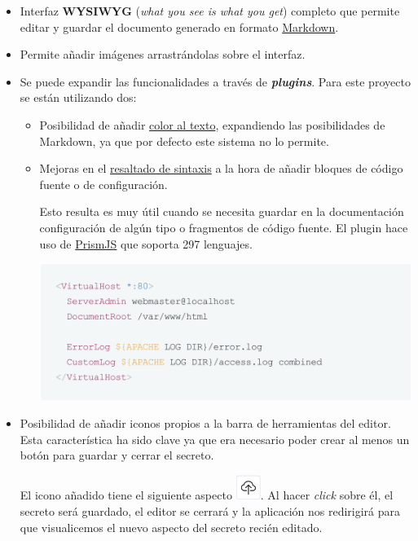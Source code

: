 \documentclass{\ClassPath/viu-tfm-template}
\begin{document}
\begin{itemize}
    \item Interfaz \textbf{WYSIWYG} (\textit{what you see is what you get}) completo que permite editar y guardar el documento generado en formato \href{https://es.wikipedia.org/wiki/Markdown}{Markdown}.
    \item Permite añadir imágenes arrastrándolas sobre el interfaz.
    \item Se puede expandir las funcionalidades a través de \textit{\textbf{plugins}}. Para este proyecto se están utilizando dos:
    \begin{itemize}
        \item Posibilidad de añadir \href{https://github.com/nhn/tui.editor/tree/master/plugins/color-syntax}{color al texto}, expandiendo las posibilidades de Markdown, ya que por defecto este sistema no lo permite.
        \item Mejoras en el \href{https://github.com/nhn/tui.editor/tree/master/plugins/color-syntax}{resaltado de sintaxis} a la hora de añadir bloques de código fuente o de configuración.

        Esto resulta es muy útil cuando se necesita guardar en la documentación configuración de algún tipo o fragmentos de código fuente. El plugin hace uso de \href{https://prismjs.com/}{PrismJS} que soporta 297 lenguajes.
        \begin{center}
            \includegraphics[frame,width=0.7\linewidth]{img/editor_example.png}
        \end{center}
    \end{itemize}

    \item Posibilidad de añadir iconos propios a la barra de herramientas del editor. Esta característica ha sido clave ya que era necesario poder crear al menos un botón para guardar y cerrar el secreto.

    El icono añadido tiene el siguiente aspecto \includegraphics[width=0.8cm]{img/save_exit.png}. Al hacer \textit{click} sobre él, el secreto será guardado, el editor se cerrará y la aplicación nos redirigirá para que visualicemos el nuevo aspecto del secreto recién editado.
\end{itemize}
\end{document}
